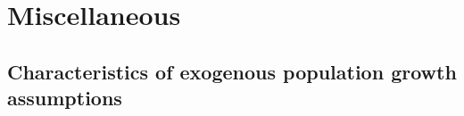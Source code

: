 \documentclass[12pt]{report}
\theoremstyle{definition}
\begin{document}















\chapter{Miscellaneous}
%

\section{Characteristics of exogenous population growth assumptions}\label{AppPopGrowth}
\end{document}
